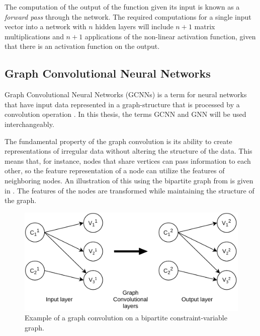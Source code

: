 The computation of the output of the function given its input is known as a \textit{forward pass} through the network. The required computations for a single input vector into a network with $ n $ hidden layers will include $ n + 1 $ matrix multiplications and $ n + 1 $ applications of the non-linear activation function, given that there is an activation function on the output. 











\subsection{Graph Convolutional Neural Networks }

Graph Convolutional Neural Networks (\gls{GCNN}s) is a term for neural networks that have input data represented in a graph-structure that is processed by a convolution operation \cite{kipf2016semisupervised}. In this thesis, the terms \gls{GCNN} and \gls{GNN} will be used interchangeably. 

The fundamental property of the graph convolution is its ability to create representations of irregular data without altering the structure of the data. This means that, for instance, nodes that share vertices can pass information to each other, so the feature representation of a node can utilize the features of neighboring nodes.  
An illustration of this using the bipartite graph from  is given in . The features of the nodes are transformed while maintaining the structure of the graph.

\begin{figure}
    \centering
    \includegraphics[width=0.8\linewidth]{img/conv_example.png}
    \caption{Example of a graph convolution on a bipartite constraint-variable graph.}
    \label{fig:conv_ex}
\end{figure}

